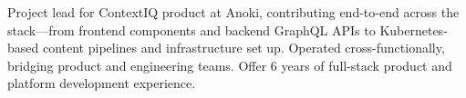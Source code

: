 

Project lead for ContextIQ product at Anoki, contributing end-to-end across the stack—from frontend components 
and backend GraphQL APIs to Kubernetes-based content pipelines and infrastructure set up. 
Operated cross-functionally, bridging product and engineering teams. 
Offer 6 years of full-stack product and platform development experience.